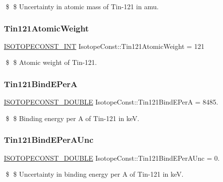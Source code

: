 \$ \$ Uncertainty in atomic mass of Tin-\/121 in amu. \mbox{\label{group___isotope_const-_tin-_sn121_ga3f1a93f0604b4fd029fd01516d1e7829}} 
\subsubsection{\texorpdfstring{Tin121\+Atomic\+Weight}{Tin121AtomicWeight}}
{\footnotesize\ttfamily \mbox{\hyperlink{group___isotope_const-_macros_ga5f18360b3e99483a35c32d789e62621c}{I\+S\+O\+T\+O\+P\+E\+C\+O\+N\+S\+T\+\_\+\+I\+NT}} Isotope\+Const\+::\+Tin121\+Atomic\+Weight = 121}

\$ \$ Atomic weight of Tin-\/121. \mbox{\label{group___isotope_const-_tin-_sn121_ga641c26001d512a9ce275715f29fa383d}} 
\subsubsection{\texorpdfstring{Tin121\+Bind\+E\+PerA}{Tin121BindEPerA}}
{\footnotesize\ttfamily \mbox{\hyperlink{group___isotope_const-_macros_ga8f45a7272ce02c0b4c65c44636ed719a}{I\+S\+O\+T\+O\+P\+E\+C\+O\+N\+S\+T\+\_\+\+D\+O\+U\+B\+LE}} Isotope\+Const\+::\+Tin121\+Bind\+E\+PerA = 8485.}

\$ \$ Binding energy per A of Tin-\/121 in keV. \mbox{\label{group___isotope_const-_tin-_sn121_ga5f3384470179188b9c4cc409ec04d17f}} 
\subsubsection{\texorpdfstring{Tin121\+Bind\+E\+Per\+A\+Unc}{Tin121BindEPerAUnc}}
{\footnotesize\ttfamily \mbox{\hyperlink{group___isotope_const-_macros_ga8f45a7272ce02c0b4c65c44636ed719a}{I\+S\+O\+T\+O\+P\+E\+C\+O\+N\+S\+T\+\_\+\+D\+O\+U\+B\+LE}} Isotope\+Const\+::\+Tin121\+Bind\+E\+Per\+A\+Unc = 0.}

\$ \$ Uncertainty in binding energy per A of Tin-\/121 in keV. \mbox{\label{group___isotope_const-_tin-_sn121_ga8c7dbda9cd1a024a082badb1c15783b6}} 
